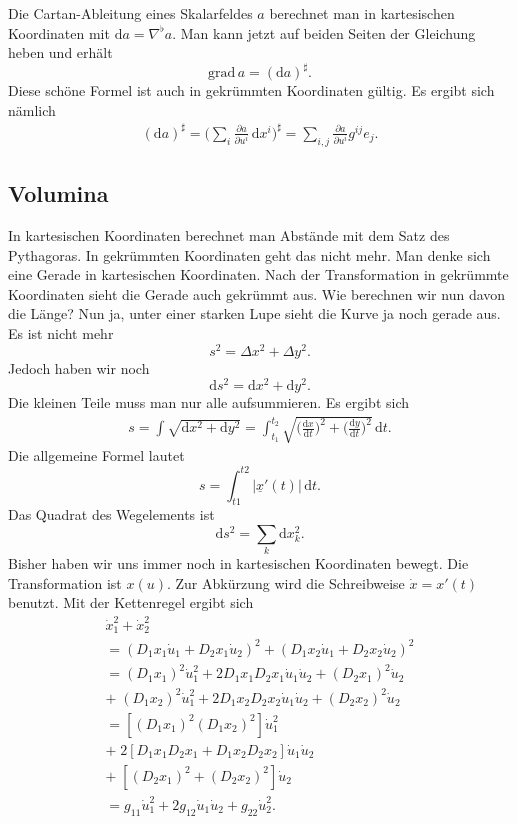 \documentclass[a4paper,10pt,fleqn,twocolumn,twoside]{article}
\begin{document}
Die Cartan-Ableitung eines Skalarfeldes \(a\) berechnet man in
kartesischen Koordinaten mit
\(\mathrm da = \nabla^\flat a\). 
Man kann jetzt auf beiden Seiten der Gleichung heben und erhält
\[\mathrm{grad}\,a = (\mathrm da)^\sharp.\]
Diese schöne Formel ist auch in gekrümmten Koordinaten gültig.
Es ergibt sich nämlich
\begin{gather*}
(\mathrm da)^\sharp
= \Big(\sum_i \frac{\partial a}{\partial u^i}
\,\mathrm dx^i\Big)^\sharp
= \sum_{i,j} \frac{\partial a}{\partial u^i}g^{ij}e_j.
\end{gather*}

\subsection{Volumina}

In kartesischen Koordinaten berechnet man Abstände mit dem Satz des
Pythagoras. In gekrümmten Koordinaten geht das nicht mehr. Man denke
sich eine Gerade in kartesischen Koordinaten. Nach der Transformation
in gekrümmte Koordinaten sieht die Gerade auch gekrümmt aus. Wie
berechnen wir nun davon die Länge? Nun ja, unter einer starken Lupe
sieht die Kurve ja noch gerade aus. Es ist nicht mehr
\[s^2 = \Delta x^2+\Delta y^2.\]
Jedoch haben wir noch
\[\mathrm ds^2 = \mathrm dx^2+\mathrm dy^2.\]
Die kleinen Teile muss man nur alle aufsummieren. Es ergibt sich
\begin{gather*}
s = \int \sqrt{\mathrm dx^2+\mathrm dy^2}
= \int_{t_1}^{t_2}\sqrt{\Big(\frac{\mathrm dx}{\mathrm dt}\Big)^2
+\Big(\frac{\mathrm dy}{\mathrm dt}\Big)^2}\,\mathrm dt.
\end{gather*}
Die allgemeine Formel lautet
\[s = \int_{t1}^{t2} |\underline x'(t)|\,\mathrm dt.\]
Das Quadrat des Wegelements ist
\[\mathrm ds^2 = \sum_k \mathrm dx_k^2.\]
Bisher haben wir uns immer noch in kartesischen Koordinaten bewegt.
Die Transformation ist \(x(u)\). Zur Abkürzung wird die Schreibweise
\(\dot x=x'(t)\) benutzt. Mit der Kettenregel ergibt sich
\begin{gather*}
\dot x_1^2+\dot x_2^2\\
= (D_1x_1\dot u_1+D_2x_1\dot u_2)^2
+ (D_1x_2\dot u_1+D_2x_2\dot u_2)^2\\
= (D_1x_1)^2\dot u_1^2+2D_1x_1D_2x_1\dot u_1\dot u_2
+ (D_2x_1)^2\dot u_2\\
+\; (D_1x_2)^2\dot u_1^2+2D_1x_2D_2x_2\dot u_1\dot u_2
+ (D_2x_2)^2\dot u_2\\
= [(D_1x_1)^2(D_1x_2)^2]\dot u_1^2\\
+\; 2[D_1x_1D_2x_1+D_1x_2D_2x_2]\dot u_1\dot u_2\\
+\; [(D_2x_1)^2+(D_2x_2)^2]\dot u_2\\
= g_{11}\dot u_1^2+2g_{12}\dot u_1\dot u_2+g_{22}\dot u_2^2.
\end{gather*}
\end{document}
